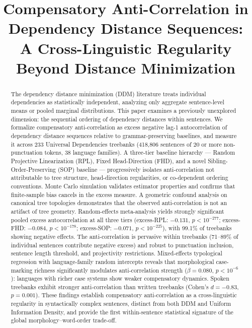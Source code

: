 \documentclass[11pt,letterpaper]{article}
\title{Compensatory Anti-Correlation in Dependency Distance Sequences:\\A Cross-Linguistic Regularity Beyond Distance Minimization}
\author{}
\date{}
\begin{document}
\maketitle

\begin{abstract}
The dependency distance minimization (DDM) literature treats individual dependencies as statistically independent, analyzing only aggregate sentence-level means or pooled marginal distributions. This paper examines a previously unexplored dimension: the sequential ordering of dependency distances within sentences. We formalize compensatory anti-correlation as excess negative lag-1 autocorrelation of dependency distance sequences relative to grammar-preserving baselines, and measure it across 233 Universal Dependencies treebanks (418,806 sentences of 20 or more non-punctuation tokens, 38 language families). A three-tier baseline hierarchy --- Random Projective Linearization (RPL), Fixed Head-Direction (FHD), and a novel Sibling-Order-Preserving (SOP) baseline --- progressively isolates anti-correlation not attributable to tree structure, head-direction regularities, or co-dependent ordering conventions. Monte Carlo simulation validates estimator properties and confirms that finite-sample bias cancels in the excess measure. A geometric confound analysis on canonical tree topologies demonstrates that the observed anti-correlation is not an artifact of tree geometry. Random-effects meta-analysis yields strongly significant pooled excess autocorrelation at all three tiers (excess-RPL: $-0.131$, $p < 10^{-277}$; excess-FHD: $-0.084$, $p < 10^{-178}$; excess-SOP: $-0.071$, $p < 10^{-225}$), with 99.1\% of treebanks showing negative effects. The anti-correlation is pervasive within treebanks (71--89\% of individual sentences contribute negative excess) and robust to punctuation inclusion, sentence length threshold, and projectivity restrictions. Mixed-effects typological regression with language-family random intercepts reveals that morphological case-marking richness significantly modulates anti-correlation strength ($\beta = 0.080$, $p < 10^{-6}$): languages with richer case systems show weaker compensatory dynamics. Spoken treebanks exhibit stronger anti-correlation than written treebanks (Cohen's $d = -0.83$, $p = 0.001$). These findings establish compensatory anti-correlation as a cross-linguistic regularity in syntactically complex sentences, distinct from both DDM and Uniform Information Density, and provide the first within-sentence statistical signature of the global morphology--word-order trade-off.
\end{abstract}
\end{document}
